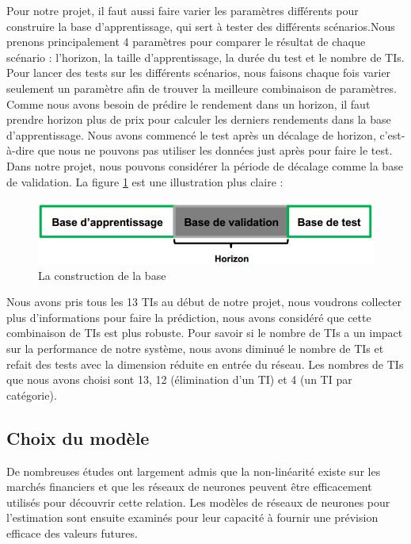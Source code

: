 Pour notre projet, il faut aussi faire varier les paramètres différents pour construire la base d'apprentissage, qui sert à tester des différents scénarios.Nous prenons principalement 4 paramètres pour comparer le résultat de chaque scénario : l'horizon, la taille d'apprentissage, la durée du test et le nombre de TIs. Pour lancer des tests sur les différents scénarios, nous faisons chaque fois varier seulement un paramètre afin de trouver la meilleure combinaison de paramètres.\\

Comme nous avons besoin de prédire le rendement dans un horizon, il faut prendre horizon plus de prix pour calculer les derniers rendements dans la base d'apprentissage. Nous avons commencé le test après un décalage de horizon, c'est-à-dire que nous ne pouvons pas utiliser les données just après pour faire le test. Dans notre projet, nous pouvons considérer la période de décalage comme la base de validation. La figure \ref{fig:BA} est une illustration plus claire : \\

\begin{figure}[H]
	\centering
	\includegraphics[width=.9\linewidth, scale=0.2]
	{plot/BA.png}
	\caption{La construction de la base}
	\label{fig:BA}
\end{figure}

Nous avons pris tous les 13 TIs au début de notre projet, nous voudrons collecter plus d’informations pour faire la prédiction, nous avons considéré que cette combinaison de TIs est plus robuste. Pour savoir si le nombre de TIs a un impact sur la performance de notre système, nous avons diminué le nombre de TIs et refait des tests avec la dimension réduite en entrée du réseau. Les nombres de TIs que nous avons choisi sont 13, 12 (élimination d'un TI) et 4 (un TI par catégorie).

\subsection{Choix du modèle}

De nombreuses études ont largement admis que la non-linéarité existe sur les marchés financiers et que les réseaux de neurones peuvent être efficacement utilisés pour découvrir cette relation. Les modèles de réseaux de neurones pour l'estimation sont ensuite examinés pour leur capacité à fournir une prévision efficace des valeurs futures.\\

